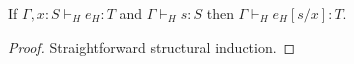 \begin{htms}
\label{htms}
If $\Gamma,x:S\vdash_{H}e_{H}:T$ and $\Gamma\vdash_{H}s:S$ then $\Gamma\vdash_{H}e_{H}[s/x]:T$.
\begin{proof}
Straightforward structural induction.
\end{proof}
\end{htms}